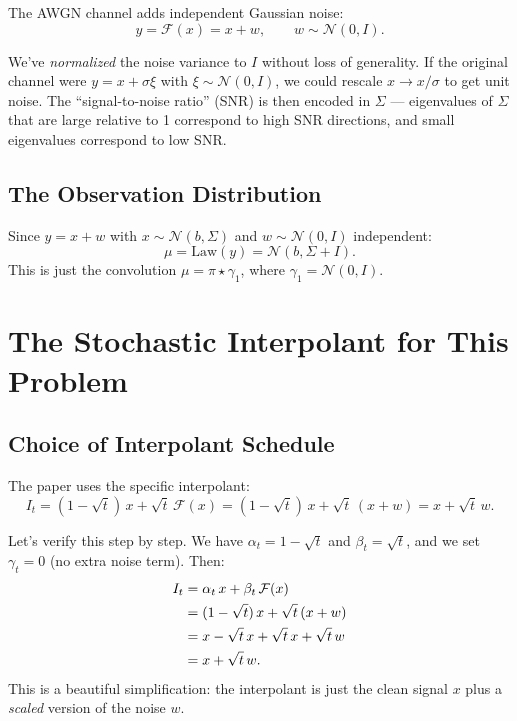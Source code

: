 \documentclass[11pt, a4paper]{article}
\theoremstyle{definition}
\begin{document}
The AWGN channel adds independent Gaussian noise:
\[
    y = \mathcal{F}(x) = x + w, \qquad w \sim \mathcal{N}(0, I).
\]

\begin{intuition}
We've \emph{normalized} the noise variance to $I$ without loss of generality. If the original channel were $y = x + \sigma \xi$ with $\xi \sim \mathcal{N}(0,I)$, we could rescale $x \to x/\sigma$ to get unit noise. The ``signal-to-noise ratio'' (SNR) is then encoded in $\Sigma$ --- eigenvalues of $\Sigma$ that are large relative to 1 correspond to high SNR directions, and small eigenvalues correspond to low SNR.
\end{intuition}

\subsection{The Observation Distribution}

Since $y = x + w$ with $x \sim \mathcal{N}(b, \Sigma)$ and $w \sim \mathcal{N}(0, I)$ independent:
\[
    \mu = \text{Law}(y) = \mathcal{N}(b, \Sigma + I).
\]
This is just the convolution $\mu = \pi \star \gamma_1$, where $\gamma_1 = \mathcal{N}(0, I)$.

\section{The Stochastic Interpolant for This Problem}

\subsection{Choice of Interpolant Schedule}

The paper uses the specific interpolant:
\[
    I_t = (1 - \sqrt{t})\, x + \sqrt{t}\, \mathcal{F}(x) = (1-\sqrt{t})\,x + \sqrt{t}\,(x + w) = x + \sqrt{t}\, w.
\]

\begin{calculation}[title={Simplifying the interpolant}]
Let's verify this step by step. We have $\alpha_t = 1-\sqrt{t}$ and $\beta_t = \sqrt{t}$, and we set $\gamma_t = 0$ (no extra noise term). Then:
\begin{align}
    I_t &= \alpha_t \, x + \beta_t \, \mathcal{F}(x) \notag \\
        &= (1 - \sqrt{t})\, x + \sqrt{t}\,(x + w) \notag \\
        &= x - \sqrt{t}\, x + \sqrt{t}\, x + \sqrt{t}\, w \notag \\
        &= x + \sqrt{t}\, w. \label{eq:It}
\end{align}
This is a beautiful simplification: the interpolant is just the clean signal $x$ plus a \emph{scaled} version of the noise $w$.
\end{calculation}
\end{document}
